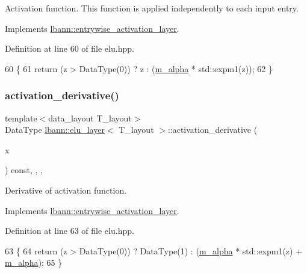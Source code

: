 Activation function. This function is applied independently to each input entry. 

Implements \hyperlink{classlbann_1_1entrywise__activation__layer_a69269401530a2112b66660383464bab9}{lbann\+::entrywise\+\_\+activation\+\_\+layer}.



Definition at line 60 of file elu.\+hpp.


\begin{DoxyCode}
60                                                  \{
61     \textcolor{keywordflow}{return} (z > DataType(0)) ? z : (\hyperlink{classlbann_1_1elu__layer_aaeb8ac055d22365a6f387c01f11db93d}{m\_alpha} * std::expm1(z));
62   \}
\end{DoxyCode}
\mbox{\label{classlbann_1_1elu__layer_ae972ed930008d1bbe499996a6f55de7e}} 
\subsubsection{\texorpdfstring{activation\+\_\+derivative()}{activation\_derivative()}}
{\footnotesize\ttfamily template$<$data\+\_\+layout T\+\_\+layout$>$ \\
Data\+Type \hyperlink{classlbann_1_1elu__layer}{lbann\+::elu\+\_\+layer}$<$ T\+\_\+layout $>$\+::activation\+\_\+derivative (\begin{DoxyParamCaption}\item[{Data\+Type}]{x }\end{DoxyParamCaption}) const\hspace{0.3cm}{\ttfamily [inline]}, {\ttfamily [override]}, {\ttfamily [protected]}, {\ttfamily [virtual]}}

Derivative of activation function. 

Implements \hyperlink{classlbann_1_1entrywise__activation__layer_a7676a4c5060452a38264993554e79f8e}{lbann\+::entrywise\+\_\+activation\+\_\+layer}.



Definition at line 63 of file elu.\+hpp.


\begin{DoxyCode}
63                                                             \{
64     \textcolor{keywordflow}{return} (z > DataType(0)) ? DataType(1) : (\hyperlink{classlbann_1_1elu__layer_aaeb8ac055d22365a6f387c01f11db93d}{m\_alpha} * std::expm1(z) + 
      \hyperlink{classlbann_1_1elu__layer_aaeb8ac055d22365a6f387c01f11db93d}{m\_alpha});
65   \}
\end{DoxyCode}
\mbox{\label{classlbann_1_1elu__layer_adc65c53cdd440f516f6018894a9befde}} 
